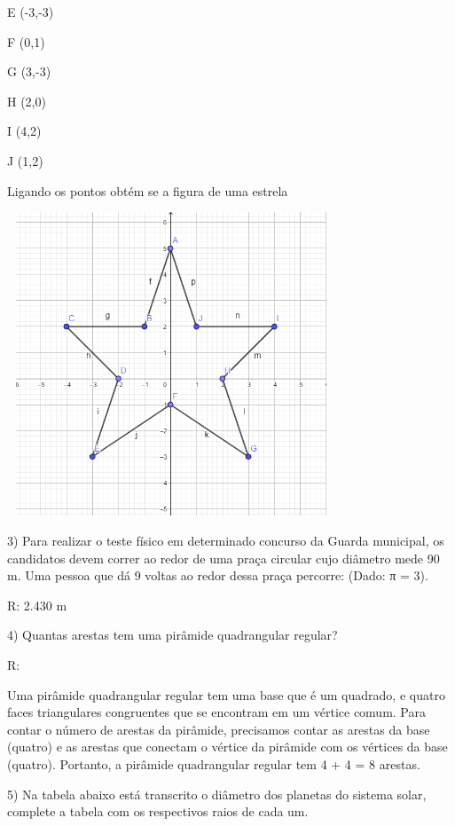 E (-3,-3)

F (0,1)

G (3,-3)

H (2,0)

I (4,2)

J (1,2)

Ligando os pontos obtém se a figura de uma estrela

\includegraphics[width=3.85417in,height=3.56597in]{./imgSAEB_6_MAT/media/image45.png}

3) Para realizar o teste físico em determinado concurso da Guarda
municipal, os candidatos devem correr ao redor de uma praça circular
cujo diâmetro mede 90 m. Uma pessoa que dá 9 voltas ao redor dessa praça
percorre: (Dado: π = 3).

R: 2.430 m

4) Quantas arestas tem uma pirâmide quadrangular regular?

R:

Uma pirâmide quadrangular regular tem uma base que é um quadrado, e
quatro faces triangulares congruentes que se encontram em um vértice
comum. Para contar o número de arestas da pirâmide, precisamos contar as
arestas da base (quatro) e as arestas que conectam o vértice da pirâmide
com os vértices da base (quatro). Portanto, a pirâmide quadrangular
regular tem 4 + 4 = 8 arestas.

5) Na tabela abaixo está transcrito o diâmetro dos planetas do sistema
solar, complete a tabela com os respectivos raios de cada um.

